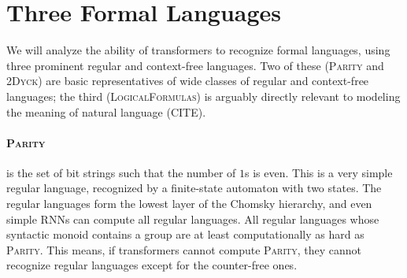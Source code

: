\documentclass[11pt,a4paper]{article}
\begin{document}
\section{Three Formal Languages} %

We will analyze the ability of transformers to recognize formal languages, using three prominent regular and context-free languages.
Two of these (\textsc{Parity} and \textsc{2Dyck}) are basic representatives of wide classes of regular and context-free languages; the third (\textsc{LogicalFormulas}) is arguably directly relevant to modeling the meaning of natural language (CITE).


\paragraph{\textsc{Parity}} is the set of bit strings such that the number of $1$s is even.
This is a very simple regular language, recognized by a finite-state automaton with two states.
The regular languages form the lowest layer of the Chomsky hierarchy, and even simple RNNs can compute all regular languages.
All regular languages whose syntactic monoid contains a group are at least computationally as hard as \textsc{Parity}.
This means, if transformers cannot compute \textsc{Parity}, they cannot recognize regular languages except for the counter-free ones.







%
%
\end{document}

